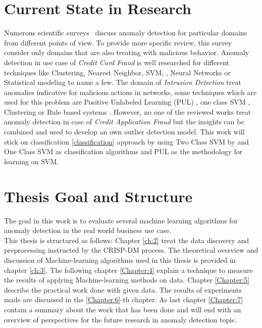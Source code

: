 \section{Current State in Research}\label{state-of-the-art}
Numerous scientific surveys~\cite{Agyemang:2006:CSN:1609942.1609946,Chandola:2009:ADS:1541880.1541882,Chandola:2012:ADD:2197072.2197116,Pimentel:2014:RRN:2588908.2589196} discuss anomaly detection for particular domains from different points of view. To provide more specific review, this survey consider only domains that are also treating with malicious behavior. Anomaly detection in use case of \textit{Credit Card Fraud} is well researched for different techniques like Clustering, Nearest Neighbor, SVM, \cite{Eskin:2010}, Neural Networks \cite{Ghosh;Reilly;1994} or Statistical modeling \cite{Agarwal:2005} to name a few. The domain of \textit{Intrusion Detection} treat anomalies indicative for malicious actions in networks, some techniques which are used for this problem are Positive Unlabeled Learning (PUL) \cite{Eskin:2010}, one class SVM \cite{Amer:2013:EOS:2500853.2500857}, Clustering \cite{Chandola:2006} or Rule based systems \cite{Salvador:2005}. However, no one of the reviewed works treat anomaly detection in case of \textit{Credit Application Fraud} but the insights can be combined and used to develop an own outlier detection model. 
This work will stick on classification \ref{classification} approach by using Two Class SVM by \cite{Cortes;Vapnik:1995} and One Class SVM \cite{Tax:2004:SVD:960091.960109} as classification algorithms and PUL \cite{Elkan;Noto:2008} as the methodology for learning on SVM. %


\section{Thesis Goal and Structure}\label{goalandstructure}
The goal in this work is to evaluate several machine learning algorithms for anomaly detection in the real world business use case. \\%
This thesis is structured as follows: Chapter \ref{ch:2} treat the data discovery and preprocessing instructed by the CRISP-DM process. The theoretical overview and discussion of Machine-learning algorithms used in this thesis is provided in chapter \ref{ch:3}. The following chapter \ref{Chapter:4} explain a technique to measure the results of applying Machine-learning methods on data. Chapter \ref{Chapter:5} describe the practical work done with given data. The results of experiments made are discussed in the \ref{Chapter:6}-th chapter. As last chapter \ref{Chapter:7} contain a summary about the work that has been done and will end with an overview of perspectives for the future research in anomaly detection topic. 
